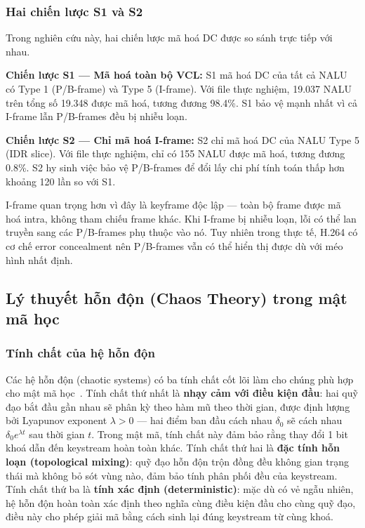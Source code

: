 \subsubsection{Hai chiến lược S1 và S2}

Trong nghiên cứu này, hai chiến lược mã hoá DC được so sánh trực tiếp với nhau.

\textbf{Chiến lược S1 --- Mã hoá toàn bộ VCL:} S1 mã hoá DC của tất cả NALU có Type 1 (P/B-frame) và Type 5 (I-frame). Với file thực nghiệm, 19.037 NALU trên tổng số 19.348 được mã hoá, tương đương 98.4\%. S1 bảo vệ mạnh nhất vì cả I-frame lẫn P/B-frames đều bị nhiễu loạn.

\textbf{Chiến lược S2 --- Chỉ mã hoá I-frame:} S2 chỉ mã hoá DC của NALU Type 5 (IDR slice). Với file thực nghiệm, chỉ có 155 NALU được mã hoá, tương đương 0.8\%. S2 hy sinh việc bảo vệ P/B-frames để đổi lấy chi phí tính toán thấp hơn khoảng 120 lần so với S1.

I-frame quan trọng hơn vì đây là keyframe độc lập --- toàn bộ frame được mã hoá intra, không tham chiếu frame khác. Khi I-frame bị nhiễu loạn, lỗi có thể lan truyền sang các P/B-frames phụ thuộc vào nó. Tuy nhiên trong thực tế, H.264 có cơ chế error concealment nên P/B-frames vẫn có thể hiển thị được dù với méo hình nhất định.

\subsection{Lý thuyết hỗn độn (Chaos Theory) trong mật mã học}

\subsubsection{Tính chất của hệ hỗn độn}

Các hệ hỗn độn (chaotic systems) có ba tính chất cốt lõi làm cho chúng phù hợp cho mật mã học~\cite{chen_chaos_video}. Tính chất thứ nhất là \textbf{nhạy cảm với điều kiện đầu}: hai quỹ đạo bắt đầu gần nhau sẽ phân kỳ theo hàm mũ theo thời gian, được định lượng bởi Lyapunov exponent $\lambda > 0$ --- hai điểm ban đầu cách nhau $\delta_0$ sẽ cách nhau $\delta_0 e^{\lambda t}$ sau thời gian $t$. Trong mật mã, tính chất này đảm bảo rằng thay đổi 1 bit khoá dẫn đến keystream hoàn toàn khác. Tính chất thứ hai là \textbf{đặc tính hỗn loạn (topological mixing)}: quỹ đạo hỗn độn trộn đồng đều không gian trạng thái mà không bỏ sót vùng nào, đảm bảo tính phân phối đều của keystream. Tính chất thứ ba là \textbf{tính xác định (deterministic)}: mặc dù có vẻ ngẫu nhiên, hệ hỗn độn hoàn toàn xác định theo nghĩa cùng điều kiện đầu cho cùng quỹ đạo, điều này cho phép giải mã bằng cách sinh lại đúng keystream từ cùng khoá.

